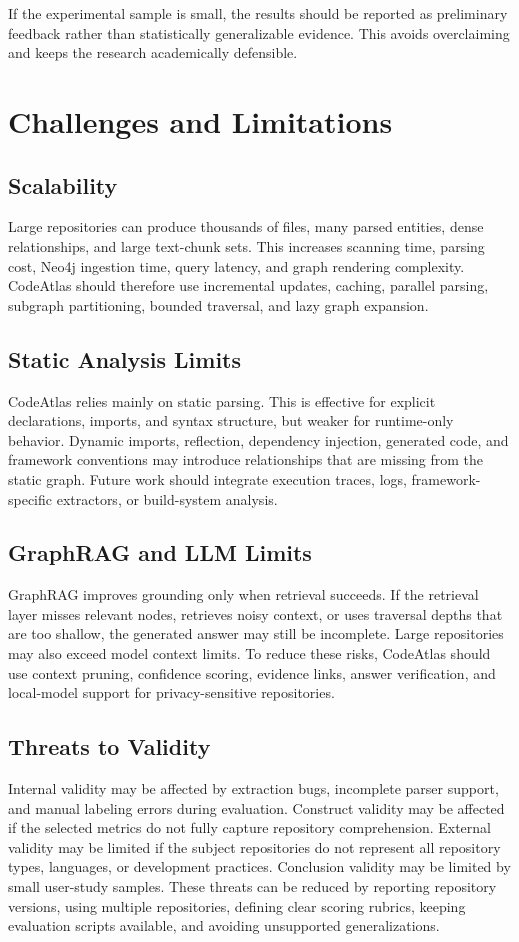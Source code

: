 \documentclass[conference]{IEEEtran}
\begin{document}
If the experimental sample is small, the results should be reported as preliminary feedback rather than statistically generalizable evidence. This avoids overclaiming and keeps the research academically defensible.

\section{Challenges and Limitations}

\subsection{Scalability}
Large repositories can produce thousands of files, many parsed entities, dense relationships, and large text-chunk sets. This increases scanning time, parsing cost, Neo4j ingestion time, query latency, and graph rendering complexity. CodeAtlas should therefore use incremental updates, caching, parallel parsing, subgraph partitioning, bounded traversal, and lazy graph expansion.

\subsection{Static Analysis Limits}
CodeAtlas relies mainly on static parsing. This is effective for explicit declarations, imports, and syntax structure, but weaker for runtime-only behavior. Dynamic imports, reflection, dependency injection, generated code, and framework conventions may introduce relationships that are missing from the static graph. Future work should integrate execution traces, logs, framework-specific extractors, or build-system analysis.

\subsection{GraphRAG and LLM Limits}
GraphRAG improves grounding only when retrieval succeeds. If the retrieval layer misses relevant nodes, retrieves noisy context, or uses traversal depths that are too shallow, the generated answer may still be incomplete. Large repositories may also exceed model context limits. To reduce these risks, CodeAtlas should use context pruning, confidence scoring, evidence links, answer verification, and local-model support for privacy-sensitive repositories.

\subsection{Threats to Validity}
Internal validity may be affected by extraction bugs, incomplete parser support, and manual labeling errors during evaluation. Construct validity may be affected if the selected metrics do not fully capture repository comprehension. External validity may be limited if the subject repositories do not represent all repository types, languages, or development practices. Conclusion validity may be limited by small user-study samples. These threats can be reduced by reporting repository versions, using multiple repositories, defining clear scoring rubrics, keeping evaluation scripts available, and avoiding unsupported generalizations.
\end{document}
